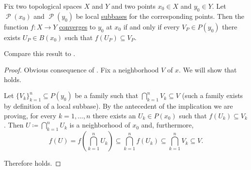 \begin{proposition}\label{thm:cauchy_function_convergence_via_subbases}
  Fix two topological spaces \( X \) and \( Y \) and two points \( x_0 \in X \) and \( y_0 \in Y \). Let \( \mscrP(x_0) \) and \( \mscrP(y_0) \) be local \hyperref[def:topological_local_subbase]{subbases} for the corresponding points. Then the function \( f: X \to Y \) \hyperref[def:local_convergence]{converges} to \( y_0 \) at \( x_0 \) if and only if every \( V_P \in P(y_0) \) there exists \( U_P \in B(x_0) \) such that \( f(U_P) \subseteq V_P \).

  Compare this result to .
\end{proposition}
\begin{proof}
  \SufficiencySubProof Obvious consequence of .
  \NecessitySubProof Fix a neighborhood \( V \) of \( x \). We will show that  holds.

  Let \( \{ V_k \}_{k=1}^n \subseteq P(y_0) \) be a family such that \( \bigcap_{k=1}^n V_k \subseteq V \) (such a family exists by definition of a local subbase). By the antecedent of the implication we are proving, for every \( k = 1, \ldots, n \) there exists an \( U_k \in P(x_0) \) such that \( f(U_k) \subseteq V_k \). Then \( U \coloneqq \bigcap_{k=1}^n U_k \) is a neighborhood of \( x_0 \) and, furthermore,
  \begin{equation*}
    f(U)
    =
    f\left(\bigcap_{k=1}^n U_k \right)
    \subseteq
    \bigcap_{k=1}^n f(U_k)
    \subseteq
    \bigcap_{k=1}^n V_k
    \subseteq
    V.
  \end{equation*}

  Therefore  holds.
\end{proof}
